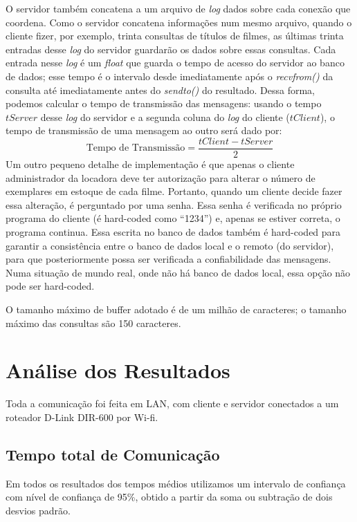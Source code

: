 \documentclass[12pt,a4paper]{article}
\begin{document}
O servidor também concatena a um arquivo de {\it log} dados sobre cada conexão que coordena. Como o servidor concatena informações num mesmo arquivo, quando o cliente fizer, por exemplo, trinta consultas de títulos de filmes, as últimas trinta entradas desse {\it log} do servidor guardarão os dados sobre essas consultas. Cada entrada nesse {\it log} é um {\it float} que guarda o tempo de acesso do servidor ao banco de dados; esse tempo é o intervalo desde imediatamente após o {\it recvfrom()} da consulta até imediatamente antes do {\it sendto()} do resultado. Dessa forma, podemos calcular o tempo de transmissão das mensagens: usando o tempo $ tServer $ desse {\it log} do servidor e a segunda coluna do {\it log} do cliente ($ tClient $), o tempo de transmissão de uma mensagem ao outro será dado por:
\begin{equation}
{\text {Tempo de Transmissão}} = \frac{tClient - tServer}{2}
\label{eqn:time}
\end{equation}
Um outro pequeno detalhe de implementação é que apenas o cliente administrador da locadora deve ter autorização para alterar o número de exemplares em estoque de cada filme. Portanto, quando um cliente decide fazer essa alteração, é perguntado por uma senha. Essa senha é verificada no próprio programa do cliente (é hard-coded como “1234”) e, apenas se estiver correta, o programa continua. Essa escrita no banco de dados também é hard-coded para garantir a consistência entre o banco de dados local e o remoto (do servidor), para que posteriormente possa ser verificada a confiabilidade das mensagens. Numa situação de mundo real, onde não há banco de dados local, essa opção não pode ser hard-coded.

O tamanho máximo de buffer adotado é de um milhão de caracteres; o tamanho máximo das consultas são 150 caracteres.


\section{Análise dos Resultados}

Toda a comunicação foi feita em LAN, com cliente e servidor conectados a um roteador D-Link DIR-600 por Wi-fi.

\subsection{Tempo total de Comunicação}

Em todos os resultados dos tempos médios utilizamos um intervalo de confiança com nível de confiança de 95\%, obtido a partir da soma ou subtração de dois desvios padrão.
\end{document}
